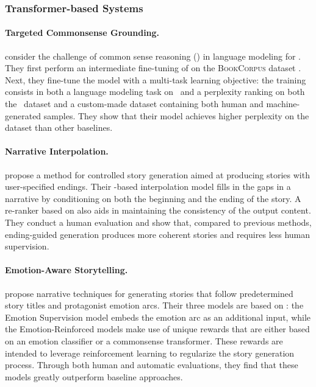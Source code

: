 \subsubsection{Transformer-based {\asg} Systems}

\paragraph{Targeted Commonsense Grounding.}
\citet{mao-etal-2019-improving} consider the challenge of common sense reasoning (\csr) in language modeling for \asg. They first perform an intermediate fine-tuning \citep{phang2018sentence, howard-ruder-2018-universal} of {\gptt} on the \textsc{BookCorpus} dataset \citep{zhu2015aligning}. Next, they fine-tune the model with a multi-task learning objective: the training consists in both a language modeling task on \wpfan\ and a perplexity ranking on both the \swag\ dataset \citep{zellers-etal-2018-swag} and a custom-made dataset containing both human and machine-generated samples. They show that their model achieves higher perplexity on the {\wpfan} dataset than other baselines.

\paragraph{Narrative Interpolation.}
\citet{wang2020narrative} propose a method for controlled story generation aimed at producing stories with user-specified endings. Their {\gptt}-based interpolation model fills in the gaps in a narrative by conditioning on both the beginning and the ending of the story. A re-ranker based on {\roberta} also aids in maintaining the consistency of the output content. They conduct a human evaluation and show that, compared to previous methods, ending-guided generation produces more coherent stories and requires less human supervision.

\paragraph{Emotion-Aware Storytelling.}
\citet{brahman2020modeling} propose narrative techniques for generating stories that follow predetermined story titles and protagonist emotion arcs. Their three models are based on {\gptt}: the Emotion Supervision model embeds the emotion arc as an additional input, while the Emotion-Reinforced models make use of unique rewards that are either based on an emotion classifier or a commonsense transformer. These rewards are intended to leverage reinforcement learning to regularize the story generation process. Through both human and automatic evaluations, they find that these models greatly outperform baseline approaches.

